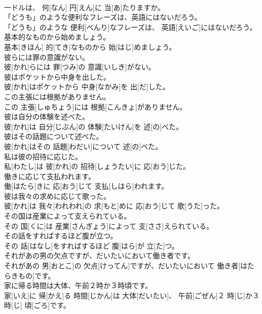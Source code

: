 \documentclass[8pt]{extreport}
\begin{document}
\begin{CJK}{UTF8}{min}
\\	一ドルは、 何[なん] 円[えん]に 当[あ]たりますか。	
\\	「どうも」のような便利なフレーズは、英語にはないだろう。	
\\	「どうも」のような 便利[べんり]なフレーズは、 英語[えいご]にはないだろう。	
\\	基本的なものから始めましょう。	
\\	基本[きほん] 的[てき]なものから 始[はじ]めましょう。	
\\	彼らには罪の意識がない。	
\\	彼[かれ]らには 罪[つみ]の 意識[いしき]がない。	
\\	彼はポケットから中身を出した。	
\\	彼[かれ]はポケットから 中身[なかみ]を 出[だ]した。	
\\	この主張には根拠がありません。	
\\	この 主張[しゅちょう]には 根拠[こんきょ]がありません。	
\\	彼は自分の体験を述べた。	
\\	彼[かれ]は 自分[じぶん]の 体験[たいけん]を 述[の]べた。	
\\	彼はその話題について述べた。	
\\	彼[かれ]はその 話題[わだい]について 述[の]べた。	
\\	私は彼の招待に応じた。	
\\	私[わたし]は 彼[かれ]の 招待[しょうたい]に 応[おう]じた。	
\\	働きに応じて支払われます。	
\\	働[はたら]きに 応[おう]じて 支払[しはら]われます。	
\\	彼は我々の求めに応じて歌った。	
\\	彼[かれ]は 我々[われわれ]の 求[もと]めに 応[おう]じて 歌[うた]った。	
\\	その国は産業によって支えられている。	
\\	その 国[くに]は 産業[さんぎょう]によって 支[ささ]えられている。	
\\	その話をすればするほど腹が立つ。	
\\	その 話[はなし]をすればするほど 腹[はら]が 立[た]つ。	
\\	それがあの男の欠点ですが、だいたいにおいて働き者です。	
\\	それがあの 男[おとこ]の 欠点[けってん]ですが、だいたいにおいて 働き者[はたらきもの]です。	
\\	家に帰る時間は大体、午前２時か３時頃です。	
\\	家[いえ]に 帰[かえ]る 時間[じかん]は 大体[だいたい]、 午前[ごぜん]２ 時[じ]か３ 時[じ] 頃[ごろ]です。	

\end{CJK}
\end{document}
